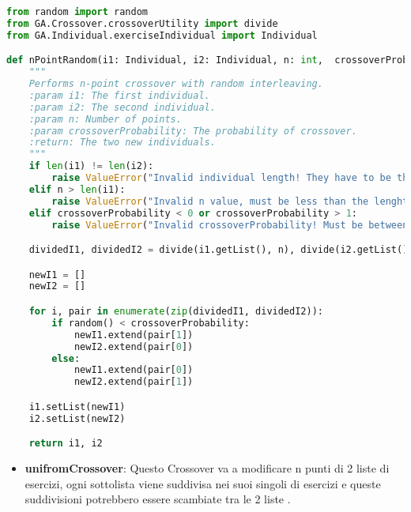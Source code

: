 \documentclass{article}
\begin{document}
\begin{lstlisting}[language=Python, breaklines, no caption]
from random import random
from GA.Crossover.crossoverUtility import divide
from GA.Individual.exerciseIndividual import Individual

def nPointRandom(i1: Individual, i2: Individual, n: int,  crossoverProbability: float) -> tuple[Individual, Individual]:
    """
    Performs n-point crossover with random interleaving.
    :param i1: The first individual.
    :param i2: The second individual.
    :param n: Number of points.
    :param crossoverProbability: The probability of crossover.
    :return: The two new individuals.
    """
    if len(i1) != len(i2):
        raise ValueError("Invalid individual length! They have to be the same.")
    elif n > len(i1):
        raise ValueError("Invalid n value, must be less than the lenght of the individual!")
    elif crossoverProbability < 0 or crossoverProbability > 1:
        raise ValueError("Invalid crossoverProbability! Must be between 0 and 1")

    dividedI1, dividedI2 = divide(i1.getList(), n), divide(i2.getList(), n)

    newI1 = []
    newI2 = []

    for i, pair in enumerate(zip(dividedI1, dividedI2)):
        if random() < crossoverProbability:
            newI1.extend(pair[1])
            newI2.extend(pair[0])
        else:
            newI1.extend(pair[0])
            newI2.extend(pair[1])

    i1.setList(newI1)
    i2.setList(newI2)

    return i1, i2
\end{lstlisting}

\begin{itemize}
\item\textbf{unifromCrossover}: Questo Crossover va a modificare n punti di 2 liste di esercizi, ogni sottolista viene suddivisa nei suoi singoli di esercizi e queste suddivisioni potrebbero essere scambiate tra le 2 liste .
\end{itemize}
\end{document}
